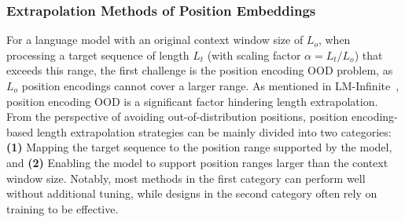 \documentclass[11pt, a4paper, logo, copyright, nonumbering]{map}
\begin{document}
\subsubsection{Extrapolation Methods of Position Embeddings}





For a language model with an original context window size of $L_o$, when processing a target sequence of length $L_t$ (with scaling factor $\alpha=L_t/L_o$) that exceeds this range, the first challenge is the position encoding OOD problem, as $L_o$ position encodings cannot cover a larger range. As mentioned in LM-Infinite~\citep{han-etal-2024-lm}, position encoding OOD is a significant factor hindering length extrapolation. From the perspective of avoiding out-of-distribution positions, position encoding-based length extrapolation strategies can be mainly divided into two categories: \textbf{(1)} Mapping the target sequence to the position range supported by the model, and \textbf{(2)} Enabling the model to support position ranges larger than the context window size. Notably, most methods in the first category can perform well without additional tuning, while designs in the second category often rely on training to be effective.
\end{document}
